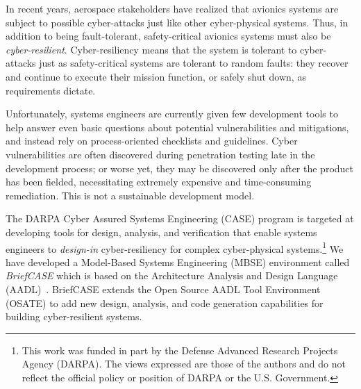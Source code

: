 In recent years, aerospace stakeholders have realized that avionics systems are subject to possible cyber-attacks just like other cyber-physical systems.  Thus, in addition to being fault-tolerant, safety-critical avionics systems must also be {\em cyber-resilient}. Cyber-resiliency means that the system is tolerant to cyber-attacks just as safety-critical systems are tolerant to random faults: they recover and continue to execute their mission function, or safely shut down, as requirements dictate. 

Unfortunately, systems engineers are currently given few development tools to help answer even basic questions about potential vulnerabilities and mitigations, and instead rely on process-oriented checklists and guidelines.  Cyber vulnerabilities are often discovered during penetration testing late in the development process; or worse yet, they may be discovered only after the product has been fielded, necessitating extremely expensive and time-consuming remediation. This is not a sustainable development model.

The DARPA Cyber Assured Systems Engineering (CASE) program is targeted at developing tools for design, analysis, and verification that enable systems engineers to {\em design-in} cyber-resiliency for complex cyber-physical systems.\footnote{This work was funded in part by the Defense Advanced Research Projects Agency (DARPA).  The views expressed are those of the authors and do not reflect the official policy or position of DARPA or the U.S. Government.}
We have developed a Model-Based Systems Engineering (MBSE) environment called {\em BriefCASE} which is based on the Architecture Analysis and Design Language (AADL)~\cite{aadl}.  BriefCASE extends the Open Source AADL Tool Environment (OSATE) to add new design, analysis, and code generation capabilities for building cyber-resilient systems.  

